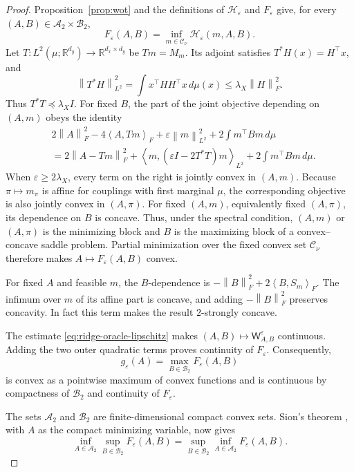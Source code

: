 \documentclass[11pt]{article}
\newcommand{\R}{\mathbb R}
\newcommand{\ip}[2]{\left\langle #1,#2\right\rangle}
\newcommand{\norm}[1]{\left\lVert #1\right\rVert}
\theoremstyle{plain}
\theoremstyle{definition}
\theoremstyle{remark}
\begin{document}
\begin{proof}
Proposition~\ref{prop:wot} and the definitions of
$\mathcal H_\varepsilon$ and $F_\varepsilon$ give, for every
$(A,B)\in\mathcal A_2\times\mathcal B_2$,
\begin{equation}\label{eq:app-F-partial-minimum}
 F_\varepsilon(A,B)
 =\inf_{m\in\mathcal C_\nu}\mathcal H_\varepsilon(m,A,B).
\end{equation}
Let $T:L^2(\mu;\R^{d_y})\to\R^{d_x\times d_y}$ be $Tm=M_m$.  Its adjoint
satisfies $T^*H(x)=H^\top x$, and
\[
 \norm{T^*H}_{L^2}^2
 =\int x^\top HH^\top x\,d\mu(x)
 \le\lambda_X\norm H_F^2.
\]
Thus $T^*T\preceq\lambda_XI$.  For fixed $B$, the part of the joint objective
depending on $(A,m)$ obeys the identity
\begin{align*}
 &2\norm A_F^2-4\ip A{Tm}_F+\varepsilon\norm m_{L^2}^2
 +2\int m^\top Bm\,d\mu\\
 &=2\norm{A-Tm}_F^2
 +\ip m{(\varepsilon I-2T^*T)m}_{L^2}
 +2\int m^\top Bm\,d\mu.
\end{align*}
When $\varepsilon\ge2\lambda_X$, every term on the right is jointly convex in
$(A,m)$.  Because $\pi\mapsto m_\pi$ is affine for couplings with first
marginal $\mu$, the corresponding objective is also jointly convex in
$(A,\pi)$.  For fixed $(A,m)$, equivalently fixed $(A,\pi)$, its dependence on
$B$ is concave.  Thus, under the spectral condition, $(A,m)$ or $(A,\pi)$ is
the minimizing block and $B$ is the maximizing block of a convex--concave
saddle problem.  Partial minimization over the fixed convex set
$\mathcal C_\nu$ therefore makes $A\mapsto F_\varepsilon(A,B)$ convex.

For fixed $A$ and feasible $m$, the $B$-dependence is
$-\norm B_F^2+2\ip B{S_m}_F$.  The infimum over $m$ of its affine part
is concave, and adding $-\norm B_F^2$ preserves concavity.  In fact this term makes
the result $2$-strongly concave.

The estimate \eqref{eq:ridge-oracle-lipschitz} makes
$(A,B)\mapsto\mathsf W_{A,B}^\varepsilon$ continuous.  Adding the two outer
quadratic terms proves continuity of $F_\varepsilon$.
Consequently,
\[
 g_\varepsilon(A)=\max_{B\in\mathcal B_2}F_\varepsilon(A,B)
\]
is convex as a pointwise maximum of convex functions and is continuous by
compactness of $\mathcal B_2$ and continuity of $F_\varepsilon$.

The sets $\mathcal A_2$ and $\mathcal B_2$ are finite-dimensional compact convex
sets.  Sion's theorem \cite{Sion}, with $A$ as the compact minimizing variable,
now gives
\[
\inf_{A\in\mathcal A_2}\sup_{B\in\mathcal B_2}F_\varepsilon(A,B)
 =\sup_{B\in\mathcal B_2}\inf_{A\in\mathcal A_2}F_\varepsilon(A,B).
\]
\end{proof}
\end{document}
